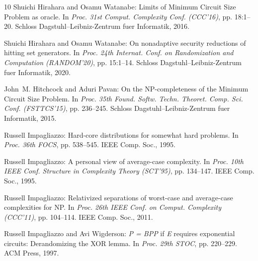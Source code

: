 \documentclass[11pt]{article}
\numberwithin{equation}{section}
\theoremstyle{definition}
\theoremstyle{plain}
\begin{document}
\begin{thebibliography}{10}
{\sc Shuichi Hirahara and Osamu Watanabe}: Limits of {M}inimum {C}ircuit {S}ize
  {P}roblem as oracle.
\newblock In {\em Proc. 31st Comput. Complexity Conf. (CCC'16)}, pp. 18:1--20.
  Schloss Dagstuhl--Leibniz-Zentrum fuer Informatik, 2016.

{\sc Shuichi Hirahara and Osamu Watanabe}: On nonadaptive security reductions
  of hitting set generators.
\newblock In {\em Proc. 24th Internat. Conf. on Randomization and Computation
  (RANDOM'20)}, pp. 15:1--14. Schloss Dagstuhl--Leibniz-Zentrum fuer
  Informatik, 2020.

{\sc John~M. Hitchcock and Aduri Pavan}: On the {NP}-completeness of the
  {M}inimum {C}ircuit {S}ize {P}roblem.
\newblock In {\em Proc. 35th Found. Softw. Techn. Theoret. Comp. Sci. Conf.
  (FSTTCS'15)}, pp. 236--245. Schloss Dagstuhl--Leibniz-Zentrum fuer
  Informatik, 2015.

{\sc Russell Impagliazzo}: Hard-core distributions for somewhat hard problems.
\newblock In {\em Proc. 36th FOCS}, pp. 538--545. IEEE Comp. Soc., 1995.

{\sc Russell Impagliazzo}: A personal view of average-case complexity.
\newblock In {\em Proc. 10th IEEE Conf. Structure in Complexity Theory
  (SCT'95)}, pp. 134--147. IEEE Comp. Soc., 1995.

{\sc Russell Impagliazzo}: Relativized separations of worst-case and
  average-case complexities for {NP}.
\newblock In {\em Proc. 26th IEEE Conf. on Comput. Complexity (CCC'11)}, pp.
  104--114. IEEE Comp. Soc., 2011.

{\sc Russell Impagliazzo and Avi Wigderson}: \emph{P = BPP} if \emph{E}
  requires exponential circuits: {D}erandomizing the {XOR} lemma.
\newblock In {\em Proc. 29th STOC}, pp. 220--229. ACM Press, 1997.
\newblock [\epfmtdoi{10.1145/258533.258590}]


\end{thebibliography}
\end{document}
